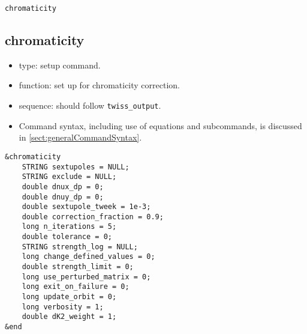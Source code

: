 \documentclass[11pt]{article}
\begin{document}
\newpage
\begin{center}{\Large\verb|chromaticity|}\end{center}
\subsection{chromaticity \label{subsec:chromaticity}}

\begin{itemize}
\item type: setup command.
\item function: set up for chromaticity correction.
\item sequence: should follow \verb|twiss_output|.
\item Command syntax, including use of equations and subcommands, is discussed in \ref{sect:generalCommandSyntax}.
\end{itemize}

\begin{verbatim}
&chromaticity
    STRING sextupoles = NULL;
    STRING exclude = NULL;
    double dnux_dp = 0;
    double dnuy_dp = 0;
    double sextupole_tweek = 1e-3;
    double correction_fraction = 0.9;
    long n_iterations = 5;
    double tolerance = 0;
    STRING strength_log = NULL;
    long change_defined_values = 0;
    double strength_limit = 0;
    long use_perturbed_matrix = 0;    
    long exit_on_failure = 0;
    long update_orbit = 0;
    long verbosity = 1;
    double dK2_weight = 1;
&end
\end{verbatim}
\end{document}
